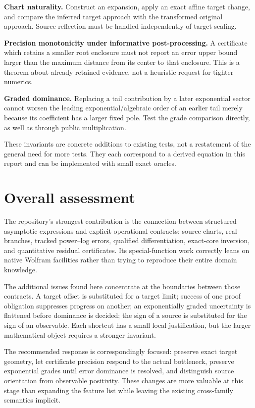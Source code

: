 \textbf{Chart naturality.} Construct an expansion, apply an exact affine target change, and compare the inferred target approach with the transformed original approach. Source reflection must be handled independently of target scaling.

\textbf{Precision monotonicity under informative post-processing.} A certificate which retains a smaller root enclosure must not report an error upper bound larger than the maximum distance from its center to that enclosure. This is a theorem about already retained evidence, not a heuristic request for tighter numerics.

\textbf{Graded dominance.} Replacing a tail contribution by a later exponential sector cannot worsen the leading exponential/algebraic order of an earlier tail merely because its coefficient has a larger fixed pole. Test the grade comparison directly, as well as through public multiplication.

These invariants are concrete additions to existing tests, not a restatement of the general need for more tests. They each correspond to a derived equation in this report and can be implemented with small exact oracles.

\section{Overall assessment}

The repository's strongest contribution is the connection between structured asymptotic expressions and explicit operational contracts: source charts, real branches, tracked power--log errors, qualified differentiation, exact-core inversion, and quantitative residual certificates. Its special-function work correctly leans on native Wolfram facilities rather than trying to reproduce their entire domain knowledge.\cite{readme,core,native,cert}

The additional issues found here concentrate at the boundaries between those contracts. A target offset is substituted for a target limit; success of one proof obligation suppresses progress on another; an exponentially graded uncertainty is flattened before dominance is decided; the sign of a source is substituted for the sign of an observable. Each shortcut has a small local justification, but the larger mathematical object requires a stronger invariant.

The recommended response is correspondingly focused: preserve exact target geometry, let certificate precision respond to the actual bottleneck, preserve exponential grades until error dominance is resolved, and distinguish source orientation from observable positivity. These changes are more valuable at this stage than expanding the feature list while leaving the existing cross-family semantics implicit.
